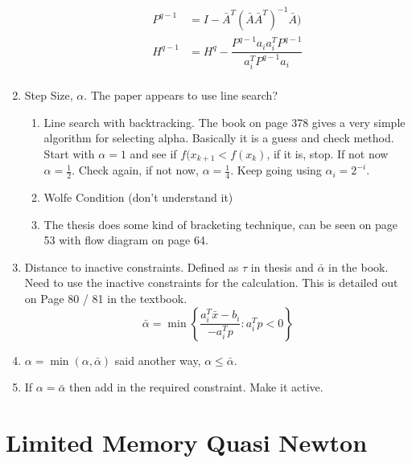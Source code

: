 \documentclass{article}
\begin{document}
\begin{enumerate}
\begin{enumerate}
        \begin{equation*}
        \begin{aligned}
            P^{q-1} & = I - \bar{A}^{T}(\bar{A}\bar{A}^T)^{-1}\bar{A}) \\
            H^{q-1} & = H^q - \dfrac{P^{q-1} a_{i} a_i^T P^{q-1}}{a_i^T P^{q-1} a_i} \\
        \end{aligned}
        \end{equation*}

    \end{enumerate}
    
    \item Step Size, $\alpha$. The paper appears to use line search?
    \begin{enumerate}
        \item Line search with backtracking. The book on page 378 gives a very simple algorithm for selecting alpha. Basically it is a guess and check method. Start with $\alpha = 1$ and see if $f(x_{k+1} < f(x_{k})$, if it is, stop. If not now $\alpha = \frac{1}{2}$. Check again, if not now, $\alpha = \frac{1}{4}$. Keep going using $\alpha_{i} = 2^{-i}$.
        \item Wolfe Condition (don't understand it)
        \item The thesis does some kind of bracketing technique, can be seen on page 53 with flow diagram on page 64.
    \end{enumerate}
    
    \item Distance to inactive constraints. Defined as $\tau$ in thesis and $\bar{\alpha}$ in the book. Need to use the inactive constraints for the calculation. This is detailed out on Page 80 / 81 in the textbook.
    \begin{equation*}
        \bar{\alpha} = \min \left\{ \dfrac{a_i^T \bar{x} - b_{i}}{-a_i^T p} : a_i^T p < 0 \right \}
    \end{equation*}
    
    \item $\alpha = \min(\alpha, \bar{\alpha})$ said another way, $\alpha \leq \bar{\alpha}$.
    
    \item If $\alpha = \bar{\alpha}$ then add in the required constraint. Make it active.
    
\end{enumerate}

\section{Limited Memory Quasi Newton}
\end{document}
